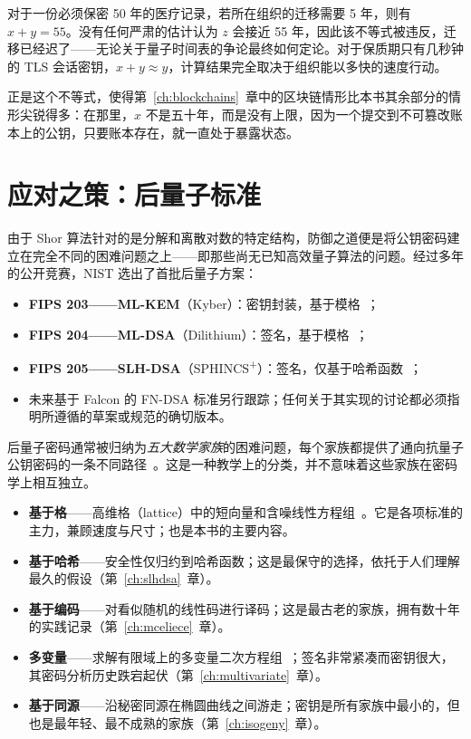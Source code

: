 \begin{example}[问题的形态]
对于一份必须保密 50 年的医疗记录，若所在组织的迁移需要 5 年，则有 $x + y = 55$。没有任何严肃的估计认为 $z$ 会接近 55 年，因此该不等式被违反，迁移已经迟了——无论关于量子时间表的争论最终如何定论。对于保质期只有几秒钟的 TLS 会话密钥，$x + y \approx y$，计算结果完全取决于组织能以多快的速度行动。
\end{example}

正是这个不等式，使得第~\ref{ch:blockchains}~章中的区块链情形比本书其余部分的情形尖锐得多：在那里，$x$ 不是五十年，而是没有上限，因为一个提交到不可篡改账本上的公钥，只要账本存在，就一直处于暴露状态。

\section{应对之策：后量子标准}

由于 Shor 算法针对的是分解和离散对数的特定结构，防御之道便是将公钥密码建立在完全不同的困难问题之上——即那些尚无已知高效量子算法的问题。经过多年的公开竞赛，NIST 选出了首批后量子方案：

\begin{itemize}
  \item \textbf{FIPS 203——ML-KEM}（Kyber）：密钥封装，基于模格~\cite{fips203}；
  \item \textbf{FIPS 204——ML-DSA}（Dilithium）：签名，基于模格~\cite{fips204}；
  \item \textbf{FIPS 205——SLH-DSA}（SPHINCS\textsuperscript{+}）：签名，仅基于哈希函数~\cite{fips205}；
  \item 未来基于 Falcon 的 FN-DSA 标准另行跟踪；任何关于其实现的讨论都必须指明所遵循的草案或规范的确切版本。
\end{itemize}

后量子密码通常被归纳为\emph{五大数学家族}的困难问题，每个家族都提供了通向抗量子公钥密码的一条不同路径~\cite{bernstein2009}。这是一种教学上的分类，并不意味着这些家族在密码学上相互独立。

\begin{itemize}
  \item \textbf{基于格}——高维格（lattice）中的短向量和含噪线性方程组~\cite{micciancioregev2009,peikert2014}。它是各项标准的主力，兼顾速度与尺寸；也是本书的主要内容。
  \item \textbf{基于哈希}——安全性仅归约到哈希函数；这是最保守的选择，依托于人们理解最久的假设（第~\ref{ch:slhdsa}~章）。
  \item \textbf{基于编码}——对看似随机的线性码进行译码；这是最古老的家族，拥有数十年的实践记录（第~\ref{ch:mceliece}~章）。
  \item \textbf{多变量}——求解有限域上的多变量二次方程组~\cite{ding2006}；签名非常紧凑而密钥很大，其密码分析历史跌宕起伏（第~\ref{ch:multivariate}~章）。
  \item \textbf{基于同源}——沿秘密同源在椭圆曲线之间游走；密钥是所有家族中最小的，但也是最年轻、最不成熟的家族（第~\ref{ch:isogeny}~章）。
\end{itemize}

